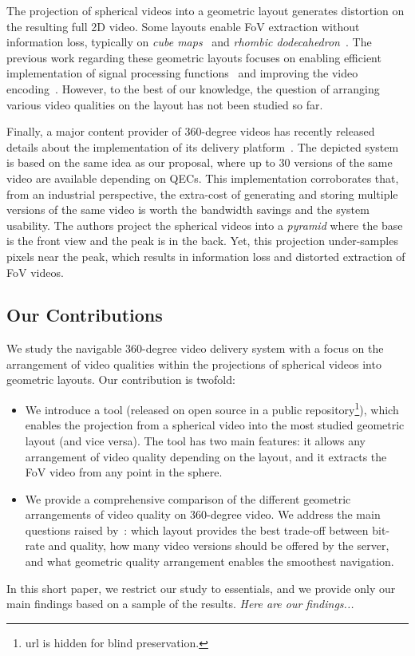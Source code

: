 The projection of spherical videos into a geometric layout generates
distortion on the resulting
full 2D video. Some layouts enable \ac{FoV} extraction without information
loss, typically on \emph{cube maps}~\cite{Ng2005} and
\emph{rhombic dodecahedron}~\cite{fu_rhombic_2009}. The previous work regarding
these
geometric layouts focuses on enabling efficient implementation of signal processing
functions~\cite{kazhdan_metric-aware_2010} and improving the video
encoding~\cite{tosic_low_2009}.
However, to the best of our knowledge, the
question of arranging various video qualities on the layout has not been studied so far.

Finally, a major content provider of 360-degree videos has recently released details about the
implementation of its delivery platform~\cite{facebook}. The depicted system is based
on the same idea as our proposal, where up to 30 versions of the same video are available depending on
\acp{QEC}. This implementation corroborates that, from an industrial perspective, the
extra-cost of
generating and storing multiple versions of the same video is worth the bandwidth
savings and the system usability. The authors project the spherical videos into a \emph{pyramid}
where the
base is the front
view and the peak is in the back. Yet, this projection under-samples pixels near the peak,
which
results in
information loss and distorted extraction of \ac{FoV} videos. 

\subsection{Our Contributions}

%
We study the navigable 360-degree video delivery system with a
focus on the arrangement of video qualities within the projections of
spherical videos into geometric layouts. Our contribution is twofold:
\begin{itemize}
\item We introduce a tool (released on open source in a public
repository\footnote{url is hidden for blind
preservation.}), which enables the projection from a spherical video
into the most studied  geometric layout (and vice versa). The tool has two main
features: it allows
any arrangement of video quality depending on the layout, and it
extracts the
\ac{FoV} video from any point in the sphere.
\item We provide a comprehensive comparison of the different geometric arrangements of
video quality on 360-degree video. We address the main questions raised
by~\citet{facebook}: which layout provides the best trade-off
between bit-rate and
quality, how many video versions should be offered by the server, and what geometric
quality arrangement
enables the smoothest navigation.
\end{itemize}

In this short paper, we restrict our study to essentials, and we provide only our main findings based on a
sample of the results. \textit{Here are our findings...}




